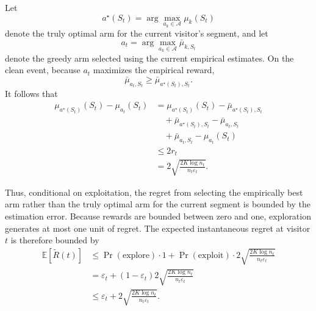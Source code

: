 \documentclass[mksc,nonblindrev]{informs3}
\begin{document}
\begin{APPENDICES}
Let
\begin{equation}
a^\star(S_t)
=
\arg\max_{a_k\in\mathcal A}
\mu_k(S_t)
\end{equation}
denote the truly optimal arm for the current visitor's segment, and let
\begin{equation}
a_t
=
\arg\max_{a_k\in\mathcal A}
\bar{\mu}_{k,S_t}
\end{equation}
denote the greedy arm selected using the current empirical estimates. On the clean event, because $a_t$ maximizes the empirical reward,
\[
\bar{\mu}_{a_t,S_t}
\geq
\bar{\mu}_{a^\star(S_t),S_t}.
\]
It follows that
\begin{align}
\mu_{a^\star(S_t)}(S_t)-\mu_{a_t}(S_t)
&=
\mu_{a^\star(S_t)}(S_t)
-
\bar{\mu}_{a^\star(S_t),S_t}
\nonumber\\
&\quad+
\bar{\mu}_{a^\star(S_t),S_t}
-
\bar{\mu}_{a_t,S_t}
\nonumber\\
&\quad+
\bar{\mu}_{a_t,S_t}
-
\mu_{a_t}(S_t)
\nonumber\\
&\leq
2r_t
\nonumber\\
&=
2
\sqrt{
\frac{2K\log n_t}
{n_t\varepsilon_t}
}.
\label{eq:segment-exploitation-bound}
\end{align}

Thus, conditional on exploitation, the regret from selecting the empirically best arm rather than the truly optimal arm for the current segment is bounded by the estimation error. Because rewards are bounded between zero and one, exploration generates at most one unit of regret. The expected instantaneous regret at visitor $t$ is therefore bounded by
\begin{align}
\mathbb E[\widetilde R(t)]
&\leq
\Pr(\text{explore})\cdot 1
+
\Pr(\text{exploit})
\cdot
2
\sqrt{
\frac{2K\log n_t}
{n_t\varepsilon_t}
}
\nonumber\\
&=
\varepsilon_t
+
(1-\varepsilon_t)
2
\sqrt{
\frac{2K\log n_t}
{n_t\varepsilon_t}
}
\nonumber\\
&\leq
\varepsilon_t
+
2
\sqrt{
\frac{2K\log n_t}
{n_t\varepsilon_t}
}.
\label{eq:reg}
\end{align}


\end{APPENDICES}
\end{document}
